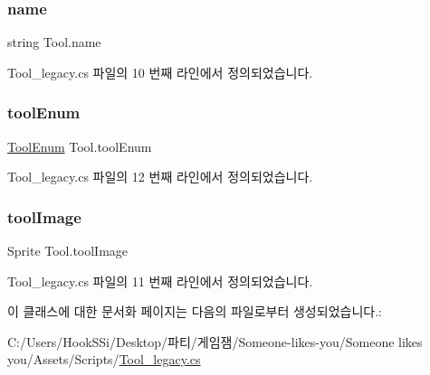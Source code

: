 \subsubsection{\texorpdfstring{name}{name}}
{\footnotesize\ttfamily string Tool.\+name}



Tool\+\_\+legacy.\+cs 파일의 10 번째 라인에서 정의되었습니다.

\mbox{\label{class_tool_aeaecfc422da3961b77f3023ed4e99651}} 
\subsubsection{\texorpdfstring{toolEnum}{toolEnum}}
{\footnotesize\ttfamily \mbox{\hyperlink{_tool__legacy_8cs_a47994263d1ab331c1e5d3e7ac555271a}{Tool\+Enum}} Tool.\+tool\+Enum}



Tool\+\_\+legacy.\+cs 파일의 12 번째 라인에서 정의되었습니다.

\mbox{\label{class_tool_a219661f916e81a5de0411c1beda81d54}} 
\subsubsection{\texorpdfstring{toolImage}{toolImage}}
{\footnotesize\ttfamily Sprite Tool.\+tool\+Image}



Tool\+\_\+legacy.\+cs 파일의 11 번째 라인에서 정의되었습니다.



이 클래스에 대한 문서화 페이지는 다음의 파일로부터 생성되었습니다.\+:\begin{DoxyCompactItemize}
\item 
C\+:/\+Users/\+Hook\+S\+Si/\+Desktop/파티/게임잼/\+Someone-\/likes-\/you/\+Someone likes you/\+Assets/\+Scripts/\mbox{\hyperlink{_tool__legacy_8cs}{Tool\+\_\+legacy.\+cs}}\end{DoxyCompactItemize}
